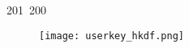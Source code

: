 201~200~\documentclass{article}
\begin{document}
	                                                                                                                                                                                                                                                                                                	                                                                                                                                        	    	                                                                                                	                                                                                                                                                                                                                                                                                        \begin{figure}[h]
	                                                                                                                                                                                                                                                                                                	                                                                                                                                        	    	                                                                                                	                                                                                                                                                                                                                                                                                            \centering
	                                                                                                                                                                                                                                                                                                	                                                                                                                                        	    	                                                                                                	                                                                                                                                                                                                                                                                                                \texttt{[image: userkey\_hkdf.png]}

\end{figure}
\end{document}
